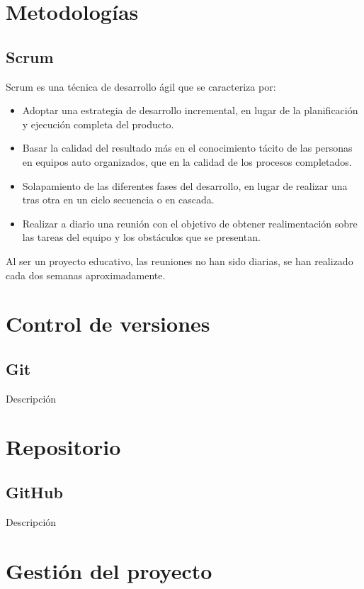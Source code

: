
\section{Metodologías}\label{metodologias}
\subsection{Scrum}\label{scrum}
Scrum es una técnica de desarrollo ágil que se caracteriza por: \cite{wiki:Scrum_(desarrollo_de_software)}
\begin{itemize}
\tightlist
\item Adoptar una estrategia de desarrollo incremental, en lugar de la planificación y ejecución completa del producto.
\item Basar la calidad del resultado más en el conocimiento tácito de las personas en equipos auto organizados, que en la calidad de los procesos completados.
\item Solapamiento de las diferentes fases del desarrollo, en lugar de realizar una tras otra en un ciclo secuencia o en cascada.
\item Realizar a diario una reunión con el objetivo de obtener realimentación sobre las tareas del equipo y los obstáculos que se presentan.
\end{itemize}
Al ser un proyecto educativo, las reuniones no han sido diarias, se han realizado cada dos semanas aproximadamente.

\section{Control de versiones}\label{control-de-versiones}
\subsection{Git}\label{git}
Descripción

\section{Repositorio}\label{repositorio}
\subsection{GitHub}\label{github}
Descripción

\section{Gestión del proyecto}\label{gestion-del-proyecto}
